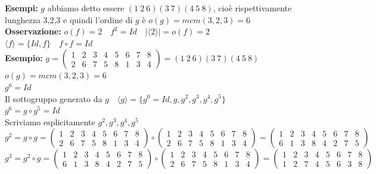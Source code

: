 \documentclass[12pt, letterpaper]{report}
\begin{document}
 		\textbf{Esempi:} $g$ abbiamo detto essere $(1\ 2\ 6)(3\ 7)(4\ 5\ 8)$, cioè rispettivamente lunghezza 3,2,3 e quindi l'ordine di $g$ è $o(g) = mcm(3,2,3) = 6$ \\
 		\textbf{Osservazione:} $o(f) = 2 \quad f^2=Id \quad |\langle 2 \rangle|=o(f)=2$ \\
 		$\langle f \rangle =\{Id, f\} \quad f \circ f = Id$ \\
 		\textbf{Esempio:} $g = \begin{pmatrix}
 			1 & 2 & 3 & 4 & 5 & 6 & 7 & 8 \\
 			2 & 6 & 7 & 5 & 8 & 1 & 3 & 4
 		\end{pmatrix} = (1\ 2\ 6)(3\ 7)(4\ 5\ 8)$ \\
 		$o(g) = mcm(3,2,3) = 6$ \\
 		$g^6 = Id$ \\
 		Il sottogruppo generato da $g \quad \langle g \rangle = \{g^0=Id, g, g^2, g^3, g^4, g^5\}$ \\
 		$g^6 = g \circ g^5 = Id$ \\
 		Scriviamo esplicitamente $g^2, g^3, g^4, g^5$ \\
 		$g^2 = g \circ g = \begin{pmatrix}
 			1 & 2 & 3 & 4 & 5 & 6 & 7 & 8 \\
 			2 & 6 & 7 & 5 & 8 & 1 & 3 & 4
 		\end{pmatrix} \circ \begin{pmatrix}
 			1 & 2 & 3 & 4 & 5 & 6 & 7 & 8 \\
 		2 & 6 & 7 & 5 & 8 & 1 & 3 & 4
 		\end{pmatrix} = \begin{pmatrix}
 		1 & 2 & 3 & 4 & 5 & 6 & 7 & 8 \\
 		6 & 1 & 3 & 8 & 4 & 2 & 7 & 5
 		\end{pmatrix}$ \\
 		$g^3 = g^2 \circ g = \begin{pmatrix}
 			1 & 2 & 3 & 4 & 5 & 6 & 7 & 8 \\
 			6 & 1 & 3 & 8 & 4 & 2 & 7 & 5
 		\end{pmatrix} \circ \begin{pmatrix}
 			1 & 2 & 3 & 4 & 5 & 6 & 7 & 8 \\
 			2 & 6 & 7 & 5 & 8 & 1 & 3 & 4
 		\end{pmatrix} = \begin{pmatrix}
 			1 & 2 & 3 & 4 & 5 & 6 & 7 & 8 \\
 			1 & 2 & 7 & 4 & 5 & 6 & 3 & 8
 		\end{pmatrix}$ \\
\end{document}
